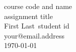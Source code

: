 \documentclass[finnish,12pt,a4paper,pdftex]{article}
\makeatletter
\newcommand{\nimi}[0] {First Last}
\newcommand{\opnro}[0] {student id}
\newcommand{\kurssi}[0] {course code and name}
\newcommand{\tehtava}[0] {assignment title}
\newcommand{\emai}[0] {your@email.address}
\makeatother
\begin{document}
\thispagestyle{empty}
\begin{center}
    \LARGE{\kurssi}\\[3 cm]
    \Large{\tehtava}\\[3 cm]
    \small{\nimi\ \opnro\\
            \emai}\\[9 cm]
    \today
\end{center}

\newpage
\setcounter{page}{1}
\pagestyle{fancy}

\end{document}
